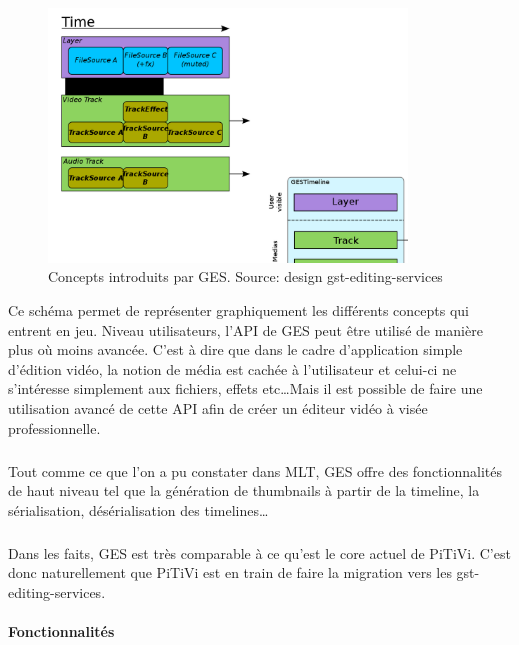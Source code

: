 \begin{figure} [H]

  \begin{center}

    \includegraphics[width=0.85\textwidth]{images/ges}

  \end{center}

  \caption{Concepts introduits par GES. Source: design
  gst-editing-services}

  \label{Yes}

\end{figure}

Ce schéma permet de représenter graphiquement les différents concepts
qui entrent en jeu. Niveau utilisateurs, l'API de GES peut
être utilisé de manière plus où moins avancée. C'est à dire
que dans le cadre d'application simple d'édition vidéo, la notion
de média est cachée à l'utilisateur et celui-ci ne s'intéresse
simplement aux fichiers, effets etc\ldots Mais il est possible de faire
une utilisation avancé de cette API afin de créer un éditeur vidéo
à visée professionnelle.

\subparagraph{}

Tout comme ce que l'on a pu constater dans MLT, GES offre des
fonctionnalités de haut niveau tel que la génération de thumbnails
à partir de la timeline, la sérialisation, désérialisation des
timelines\ldots

\subparagraph{}

Dans les faits, GES est très comparable à ce qu'est le core actuel
de PiTiVi. C'est donc naturellement que PiTiVi est en train de faire la
migration vers les gst-editing-services.

\paragraph{Fonctionnalités}


